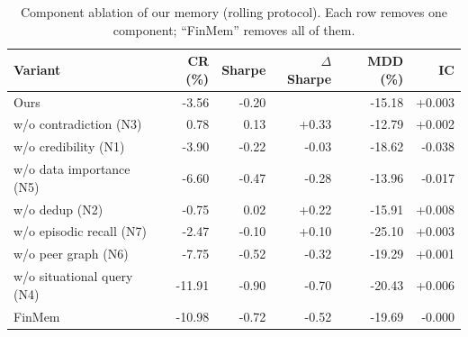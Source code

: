 \begin{table}[ht]
\centering
\caption{Component ablation of our memory (rolling protocol). Each row removes one component; ``FinMem'' removes all of them.}
\label{tab:ablation}
\begin{tabular}{lrrrrr}
\hline
Variant & CR (\%) & Sharpe & $\Delta$Sharpe & MDD (\%) & IC \\
\hline
Ours & -3.56 & -0.20 &  & -15.18 & +0.003 \\
w/o contradiction (N3) & 0.78 & 0.13 & +0.33 & -12.79 & +0.002 \\
w/o credibility (N1) & -3.90 & -0.22 & -0.03 & -18.62 & -0.038 \\
w/o data importance (N5) & -6.60 & -0.47 & -0.28 & -13.96 & -0.017 \\
w/o dedup (N2) & -0.75 & 0.02 & +0.22 & -15.91 & +0.008 \\
w/o episodic recall (N7) & -2.47 & -0.10 & +0.10 & -25.10 & +0.003 \\
w/o peer graph (N6) & -7.75 & -0.52 & -0.32 & -19.29 & +0.001 \\
w/o situational query (N4) & -11.91 & -0.90 & -0.70 & -20.43 & +0.006 \\
FinMem & -10.98 & -0.72 & -0.52 & -19.69 & -0.000 \\
\hline
\end{tabular}
\end{table}
